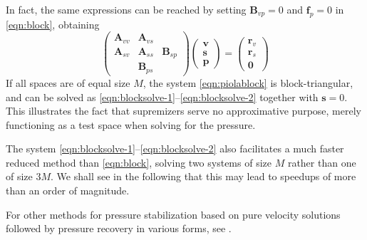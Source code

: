 \documentclass[onecolumn, twoside, a4paper, 11pt]{article}
\begin{document}
In fact, the same expressions can be reached by setting $\bm B_{vp} = 0$ and
$\bm f_p = 0$ in \eqref{eqn:block}, obtaining
\begin{equation}
  \label{eqn:piolablock}
  \begin{pmatrix}
    \bm A_{vv} & \bm A_{vs} & \\
    \bm A_{sv} & \bm A_{ss} & \bm B_{sp} \\
    & \bm B_{ps} & \end{pmatrix}
  \begin{pmatrix} \bm v \\ \bm s \\ \bm p \end{pmatrix}
  = \begin{pmatrix} \bm r_v \\ \bm r_s \\ \bm 0 \end{pmatrix}
\end{equation}
If all spaces are of equal size $M$, the system \eqref{eqn:piolablock} is
block-triangular, and can be solved as
\eqref{eqn:blocksolve-1}--\eqref{eqn:blocksolve-2} together with $\bm s = 0$.
This illustrates the fact that supremizers serve no approximative purpose,
merely functioning as a test space when solving for the pressure.

The system \eqref{eqn:blocksolve-1}--\eqref{eqn:blocksolve-2} also facilitates a
much faster reduced method than \eqref{eqn:block}, solving two systems of size
$M$ rather than one of size $3M$. We shall see in the following that this may
lead to speedups of more than an order of magnitude.

For other methods for pressure stabilization based on pure velocity solutions
followed by pressure recovery in various forms, see
\cite{Akhtar2009ser,Caiazzo2014niv,Baiges2013ero}.


\end{document}
